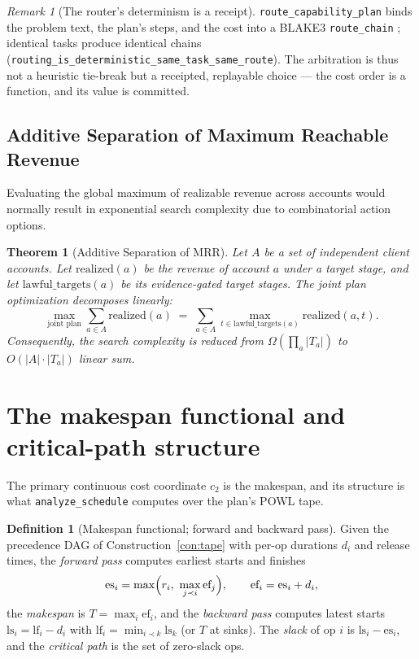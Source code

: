 \documentclass[11pt,oneside]{book}
\theoremstyle{definition}
\newtheorem{definition}{Definition}[chapter]
\theoremstyle{plain}
\newtheorem{theorem}{Theorem}[chapter]
\theoremstyle{remark}
\newtheorem*{remark}{Remark}
\newcommand{\code}[1]{\texttt{#1}}
\begin{document}
\begin{remark}[The router's determinism is a receipt]
\code{route\_capability\_plan} binds the problem text, the plan's steps, and the cost into a
BLAKE3 \code{route\_chain} \cite{blake3}; identical tasks produce identical chains
(\code{routing\_is\_deterministic\_same\_task\_same\_route}). The arbitration is thus not a
heuristic tie-break but a receipted, replayable choice --- the cost order is a function, and its
value is committed.
\end{remark}

\subsection{Additive Separation of Maximum Reachable Revenue}

Evaluating the global maximum of realizable revenue across accounts would normally result in exponential search complexity due to combinatorial action options.

\begin{theorem}[Additive Separation of MRR]\label{thm:mrr}
Let $A$ be a set of independent client accounts. Let $\text{realized}(a)$ be the revenue of account $a$ under a target stage, and let $\text{lawful\_targets}(a)$ be its evidence-gated target stages. The joint plan optimization decomposes linearly:
\begin{equation}\label{eq:mrr}
\max_{\text{joint plan}} \sum_{a\in A} \text{realized}(a)\;=\;\sum_{a\in A} \max_{t \in \text{lawful\_targets}(a)} \text{realized}(a, t).
\end{equation}
Consequently, the search complexity is reduced from $\Omega(\prod_a |T_a|)$ to $O(|A|\cdot |T_a|)$ linear sum.
\end{theorem}

\section{The makespan functional and critical-path structure}
\label{sec:makespan}

The primary continuous cost coordinate $c_2$ is the makespan, and its structure is what
\code{analyze\_schedule} computes over the plan's POWL tape.

\begin{definition}[Makespan functional; forward and backward pass]\label{def:makespan}
Given the precedence DAG of Construction~\ref{con:tape} with per-op durations $d_i$ and release
times, the \emph{forward pass} computes earliest starts and finishes
\[
\text{es}_i=\max\Bigl(r_i,\ \max_{j\prec i}\text{ef}_j\Bigr),\qquad \text{ef}_i=\text{es}_i+d_i,
\]
the \emph{makespan} is $T=\max_i \text{ef}_i$, and the \emph{backward pass} computes latest
starts $\text{ls}_i=\text{lf}_i-d_i$ with $\text{lf}_i=\min_{i\prec k}\text{ls}_k$ (or $T$ at
sinks). The \emph{slack} of op $i$ is $\text{ls}_i-\text{es}_i$, and the \emph{critical path}
is the set of zero-slack ops.
\end{definition}
\end{document}
